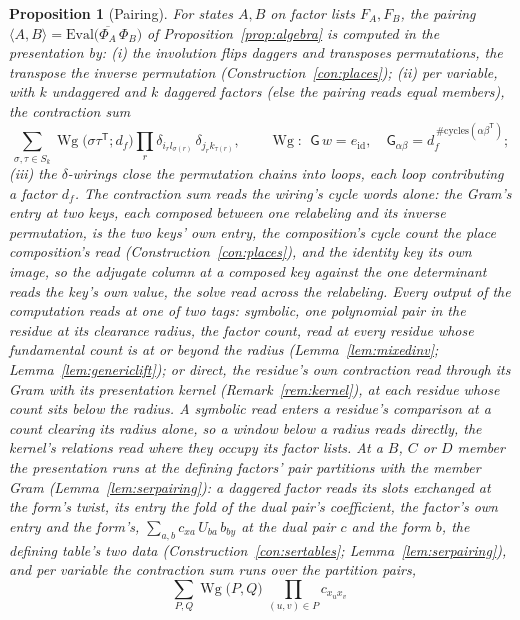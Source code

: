\documentclass[11pt]{article}
\newtheorem{proposition}{Proposition}
\theoremstyle{definition}
\newcommand{\Wg}{\operatorname{Wg}}
\begin{document}
\begin{proposition}[Pairing]\label{prop:wg}
For states $A,B$ on factor lists $F_A,F_B$, the pairing
$\langle A,B\rangle=\mathrm{Eval}\big(\overline{\Phi_A}\,\Phi_B\big)$ of
Proposition~\ref{prop:algebra} is computed in the presentation by: (i)
the involution flips daggers and transposes permutations, the
transpose the inverse permutation (Construction~\ref{con:places}); (ii) per variable, with
$k$ undaggered and $k$ daggered factors (else the pairing reads equal
members), the
contraction sum
\[
\sum_{\sigma,\tau\in S_k}\Wg\!\big(\sigma\tau^{\mathsf T};d_f\big)
\prod_r \delta_{i_r l_{\sigma(r)}}\,\delta_{j_r k_{\tau(r)}},
\qquad
\Wg:\ \ \mathsf G\,w=e_{\mathrm{id}},\quad \mathsf G_{\alpha\beta}
=d_f^{\,\#\mathrm{cycles}(\alpha\beta^{\mathsf T})} ;
\]
(iii) the $\delta$-wirings close the permutation chains into loops, each
loop contributing a factor $d_f$.
The contraction sum reads the wiring's cycle words alone: the
Gram's entry at two keys, each composed between one relabeling and
its inverse permutation, is the two keys' own entry, the
composition's cycle count the place composition's read
(Construction~\ref{con:places}), and the identity key its own
image, so the adjugate column at a composed key against the one
determinant reads the key's own value, the solve read across the
relabeling.
Every output of the computation reads at one of two \emph{tags}:
\emph{symbolic}, one polynomial pair in the residue at its
\emph{clearance radius}, the factor count, read at every residue
whose fundamental count is at or beyond the radius
(Lemma~\ref{lem:mixedinv}; Lemma~\ref{lem:genericlift}); or
\emph{direct}, the residue's own contraction read through its Gram
with its presentation kernel (Remark~\ref{rem:kernel}), at each
residue whose count sits below the radius. A symbolic read enters a
residue's comparison at a count clearing its radius alone, so a
window below a radius reads directly, the kernel's relations read
where they occupy its factor lists. At a $B$, $C$ or $D$ member the
presentation runs at the defining factors' pair partitions with
the member Gram (Lemma~\ref{lem:serpairing}): a daggered factor
reads its slots exchanged at the form's twist, its entry the fold
of the dual pair's coefficient, the factor's own entry and the
form's, $\sum_{a,b}c_{xa}\,U_{ba}\,b_{by}$ at the dual pair $c$
and the form $b$, the defining table's two data
(Construction~\ref{con:sertables}; Lemma~\ref{lem:serpairing}),
and per variable the contraction sum runs over the partition
pairs,
\[
\sum_{P,Q}\Wg\big(P,Q\big)\
\prod_{(u,v)\in P}\!c_{x_ux_v}\
\]
\end{proposition}
\end{document}

